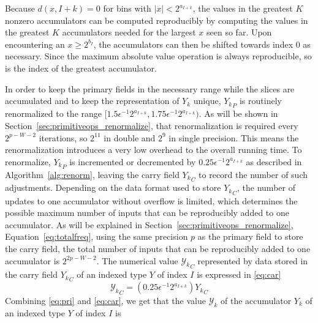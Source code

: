       Because $d(x, I + k) = 0$ for bins with $|x| < 2^{a_{I + k}}$, the values
      in the greatest $K$ nonzero accumulators can be computed reproducibly by
      computing the values in the greatest $K$ accumulators needed for the
      largest $x$ seen so far. Upon encountering an $x \geq 2^{b_I}$, the
      accumulators can then be shifted towards index $0$ as necessary.  Since
      the maximum absolute value operation is always reproducible, so is the
      index of the greatest accumulator.

      In order to keep the primary fields in the necessary range while the
      slices are accumulated and to keep the representation of $Y_k$ unique,
      ${Y_k}_P$ is routinely renormalized to the range 
      \(
        [1.5 \epsilon^{-1} 2^{a_{I + k}}, 1.75 \epsilon^{-1} 2^{a_{I + k}}).
      \)
      As will be shown in Section~\ref{sec:primitiveops_renormalize},
      that renormalization is required every $2^{p-W-2}$ iterations,
      so $2^{11}$ in double and $2^9$ in single precision.
      This means the renormalization introduces a very low overhead
      to the overall running time.
      To renormalize, ${Y_k}_P$ is incremented or decremented by
      $0.25 \epsilon^{-1} 2^{a_{I + k}}$ as described in Algorithm~\ref{alg:renorm},
      leaving the carry field ${Y_k}_C$ to record the number of such adjustments.
      Depending on the data format used to store ${Y_k}_C$, the number of
      updates to one accumulator without overflow is limited,
      which determines the possible maximum number of inputs that can be
      reproducibly added to one accumulator.
      As will be explained in Section~\ref{sec:primitiveops_renormalize},
      Equation~\eqref{eq:totalfreq}, using the same precision $p$ as the primary field
      to store the carry field, the total number of inputs
      that can be reproducibly added to one accumulator is $2^{2p-W-2}$.
      The numerical value ${\mathcal{Y}_k}_C$ represented by data stored in the carry field
      ${Y_k}_C$ of an indexed type $Y$ of index $I$ is expressed in
      \eqref{eq:car}
      \begin{equation}
        {\mathcal{Y}_k}_C = (0.25\epsilon^{-1}2^{a_{I + k}}){Y_k}_C
        \label{eq:car}
      \end{equation}
      Combining \eqref{eq:pri} and \eqref{eq:car}, we get that the value $\mathcal{Y}_k$ of the accumulator $Y_k$ of an indexed type $Y$ of index $I$ is
